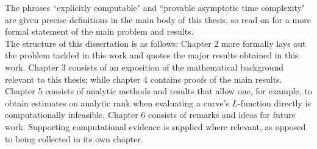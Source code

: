 The phrases ``explicitly computable" and ``provable asymptotic time complexity" are given precise definitions in the main body of this thesis, so read on for a more formal statement of the main problem and results. \\

The structure of this dissertation is as follows: Chapter 2 more formally lays out the problem tackled in this work and quotes the major results obtained in this work. Chapter 3 consists of an exposition of the mathematical background relevant to this thesis; while chapter 4 contains proofs of the main results. Chapter 5 consists of analytic methods and results that allow one, for example, to obtain estimates on analytic rank when evaluating a curve's $L$-function directly is computationally infeasible. Chapter 6 consists of remarks and ideas for future work. Supporting computational evidence is supplied where relevant, as opposed to being collected in its own chapter. 
